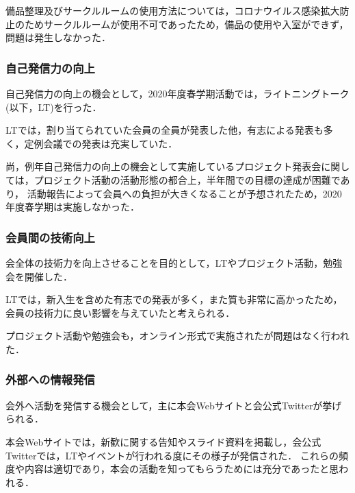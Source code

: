     備品整理及びサークルルームの使用方法については，コロナウイルス感染拡大防止のためサークルルームが使用不可であったため，備品の使用や入室ができず，問題は発生しなかった．

\subsubsection*{自己発信力の向上}
    自己発信力の向上の機会として，2020年度春学期活動では，ライトニングトーク(以下，LT)を行った．

    LTでは，割り当てられていた会員の全員が発表した他，有志による発表も多く，定例会議での発表は充実していた．

    尚，例年自己発信力の向上の機会として実施しているプロジェクト発表会に関しては，プロジェクト活動の活動形態の都合上，半年間での目標の達成が困難であり，
    活動報告によって会員への負担が大きくなることが予想されたため，2020年度春学期は実施しなかった．

\subsubsection*{会員間の技術向上}
    会全体の技術力を向上させることを目的として，LTやプロジェクト活動，勉強会を開催した．

    LTでは，新入生を含めた有志での発表が多く，また質も非常に高かったため，会員の技術力に良い影響を与えていたと考えられる．

    プロジェクト活動や勉強会も，オンライン形式で実施されたが問題はなく行われた．

\subsubsection*{外部への情報発信}
    会外へ活動を発信する機会として，主に本会Webサイトと会公式Twitterが挙げられる．

    本会Webサイトでは，新歓に関する告知やスライド資料を掲載し，会公式Twitterでは，LTやイベントが行われる度にその様子が発信された．
    これらの頻度や内容は適切であり，本会の活動を知ってもらうためには充分であったと思われる．
